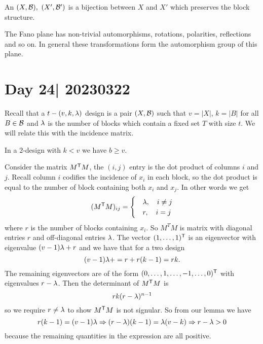 \documentclass[12pt]{memoir}
\begin{document}
\begin{Def}
    An  $(X,\mathcal{B}),\ (X',\mathcal{B}')$ is a bijection between $X$ and $X'$ which preserves the block structure.
\end{Def}

\begin{Ex}
    The Fano plane has non-trivial automorphisms, rotations, polarities, reflections and so on. In general these transformations form the automorphism group of this plane.
\end{Ex}

\section{Day 24| 20230322}

Recall that a $t-(v,k,\lambda)$ design is a pair $(X,\mathcal{B})$ such that $v=|X|$, $k=|B|$ for all $B\in\mathcal{B}$ and $\lambda$ is the number of blocks which contain a fixed set $T$ with size $t$. We will relate this with the incidence matrix.

\begin{Th}
    In a $2$-design with $k<v$ we have $b\geq v$.
\end{Th}

\begin{ptcbp}
    Consider the matrix $M^{\mathsf{T}} M$, the $(i,j)$ entry is the dot product of columns $i$ and $j$. Recall column $i$ codifies the incidence of $x_i$ in each block, so the dot product is equal to the number of block containing both $x_i$ and $x_j$. In other words we get 
    $$(M^{\mathsf{T}}M)_{ij}=\begin{cases}
        &\lambda,\quad i\neq j\\
        &r,\quad i=j
    \end{cases}$$
    where $r$ is the number of blocks containing $x_i$. So $M^TM$ is matrix with diagonal entries $r$ and off-diagonal entries $\lambda$. The vector $(1,\dots,1)^{\mathsf{T}}$ is an eigenvector with eigenvalue $(v-1)\lambda+r$ and we have that for a two design 
    $$(v-1)\lambda+=r+r(k-1)=rk.$$
    The remaining eigenvectors are of the form $(0,\dots,1,\dots,-1,\dots,0)^{\mathsf{T}}$ with eigenvalues $r-\lambda$. Then the determinant of $M^{\mathsf{T}} M$ is 
    $$rk(r-\lambda)^{n-1}$$
    so we require $r\neq \lambda$ to show $M^{\mathsf{T}} M$ is not signular. So from our lemma we have 
    $$r(k-1)=(v-1)\lambda\Rightarrow (r-\lambda)(k-1)=\lambda(v-k)\Rightarrow r-\lambda>0$$
    because the remaining quantities in the expression are all positive. 
\end{ptcbp}
\end{document}
